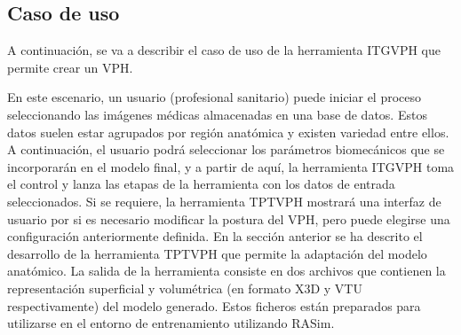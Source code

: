 \subsection{Caso de uso}
\label{rasim:casodeuso}
A continuación, se va a describir el caso de uso de la herramienta \ac{ITGVPH} que permite crear un \ac{VPH}.

En este escenario, un usuario (profesional sanitario) puede iniciar el proceso seleccionando las imágenes médicas almacenadas en una base de datos. Estos datos suelen estar agrupados por región anatómica y existen variedad entre ellos. A continuación, el usuario podrá seleccionar los parámetros biomecánicos que se incorporarán en el modelo final, y a partir de aquí, la herramienta \ac{ITGVPH} toma el control y lanza las etapas de la herramienta con los datos de entrada seleccionados. Si se requiere, la herramienta \ac{TPTVPH} mostrará una interfaz de usuario por si es necesario modificar la postura del \ac{VPH}, pero puede elegirse una configuración anteriormente definida. En la sección anterior se ha descrito el desarrollo de la herramienta \ac{TPTVPH} que permite la adaptación del modelo anatómico.
La salida de la herramienta consiste en dos archivos que contienen la representación superficial y volumétrica (en formato \ac{X3D} y \ac{VTU} respectivamente) del modelo generado. Estos ficheros están preparados para utilizarse en el entorno de entrenamiento utilizando \ac{RASim}.



